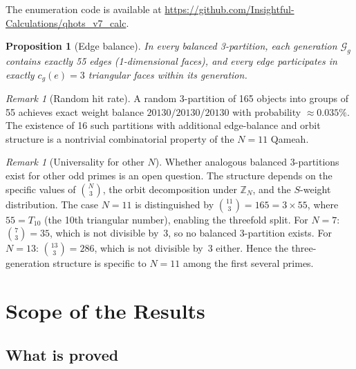 \documentclass[aip,jmp,reprint,superscriptaddress,floatfix,nofootinbib]{revtex4-2}
\newtheorem{proposition}[theorem]{Proposition}
\theoremstyle{definition}
\theoremstyle{remark}
\newtheorem{remark}[theorem]{Remark}
\begin{document}
\noindent
The enumeration code is available at
\url{https://github.com/Insightful-Calculations/qhots_v7_calc}.

\begin{proposition}[Edge balance]
\label{prop:edge-balance}
In every balanced 3-partition, each generation $\mathcal{G}_g$ contains
exactly 55 edges (1-dimensional faces), and every edge participates
in exactly $c_g(e) = 3$ triangular faces within its generation.
\end{proposition}

\begin{remark}[Random hit rate]
A random 3-partition of 165 objects into groups of 55 achieves
exact weight balance $20130/20130/20130$ with probability
$\approx 0.035\%$.  The existence of 16 such partitions with
additional edge-balance and orbit structure is a nontrivial
combinatorial property of the $N{=}11$ Qameah.
\end{remark}

\begin{remark}[Universality for other $N$]
Whether analogous balanced 3-partitions exist for other odd primes
is an open question.  The structure depends on the specific values
of $\binom{N}{3}$, the orbit decomposition under $\mathbb{Z}_N$,
and the $S$-weight distribution.  The case $N{=}11$ is distinguished
by $\binom{11}{3} = 165 = 3 \times 55$, where $55 = T_{10}$
(the 10th triangular number), enabling the threefold split.
For $N{=}7$: $\binom{7}{3} = 35$, which is not divisible by~3,
so no balanced 3-partition exists.  For $N{=}13$:
$\binom{13}{3} = 286$, which is not divisible by~3 either.
Hence the three-generation structure is specific to $N{=}11$
among the first several primes.
\end{remark}

\section{Scope of the Results}
\label{sec:honest}

\subsection{What is proved}
\end{document}
